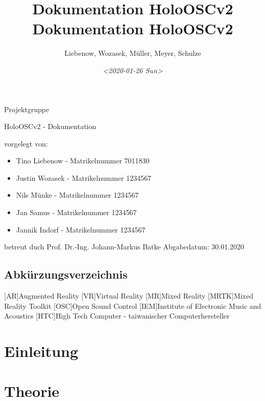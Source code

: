 \documentclass[11pt, titlepage, fleqn]{report}
\author{Liebenow, Wozasek, Müller, Meyer, Schulze}
\date{\textit{<2020-01-26 Sun>}}
\title{Dokumentation HoloOSCv2\\\medskip
\large Dokumentation HoloOSCv2}
\begin{document}
    \begin{titlepage}%
        \hsellogo\hfill Projektgruppe %
        \par
        \vspace{4cm}
        \noindent\parbox{0.8\textwidth}{\Huge\sloppy
	    HoloOSCv2 - Dokumentation}  
        \vspace{2cm}

        \Large \noindent vorgelegt von:
        \begin{itemize}
            \item Tino Liebenow - Matrikelnummer 7011830
            \item Justin Wozasek - Matrikelnummer 1234567
            \item Nils Münke - Matrikelnummer 1234567
            \item Jan  Samus - Matrikelnummer 1234567
            \item Jannik Indorf - Matrikelnummer 1234567
        \end{itemize}
        \vspace{2cm}
        betreut duch\newline
        Prof. Dr.-Ing. Johann-Markus Batke\newline
        Abgabedatum: 30.01.2020
    \end{titlepage}
    \newpage
    \tableofcontents %
    \listoffigures%
    \newpage
    \section*{\Huge Abkürzungsverzeichnis}%
    \label{sec:Abkürzungsverzeichnis}
    \vspace{1cm}
    \begin{acronym}
        [AR]{Augmented Reality}
        [VR]{Virtual Reality}
        [MR]{Mixed Reality}
        [MRTK]{Mixed Reality Toolkit}
        [OSC]{Open Sound Control}
        [IEM]{Institute of Electronic Music and Acoustics}
        [HTC]{High Tech Computer - taiwanischer Computerhersteller}
    \end{acronym}  
    \newpage
    \chapter{Einleitung}%
    \label{sec:Einleitung}
   
    
    \chapter{Theorie}%
    \label{sec:Theorie}
\end{document}
